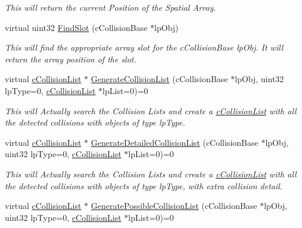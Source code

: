 \begin{DoxyCompactItemize}
\begin{DoxyCompactList}\small\item\em This will return the current Position of the Spatial Array. \end{DoxyCompactList}\item 
\hypertarget{classc_collision_handler_a10c1268f0a7418032431e3029baff400}{
virtual uint32 \hyperlink{classc_collision_handler_a10c1268f0a7418032431e3029baff400}{FindSlot} (cCollisionBase $\ast$lpObj)}
\label{classc_collision_handler_a10c1268f0a7418032431e3029baff400}

\begin{DoxyCompactList}\small\item\em This will find the appropriate array slot for the cCollisionBase lpObj. It will return the array position of the slot. \end{DoxyCompactList}\item 
\hypertarget{classc_collision_handler_ae624b12e08bdae8b2dd252bcfa6f7d36}{
virtual \hyperlink{classc_collision_list}{cCollisionList} $\ast$ \hyperlink{classc_collision_handler_ae624b12e08bdae8b2dd252bcfa6f7d36}{GenerateCollisionList} (cCollisionBase $\ast$lpObj, uint32 lpType=0, \hyperlink{classc_collision_list}{cCollisionList} $\ast$lpList=0)=0}
\label{classc_collision_handler_ae624b12e08bdae8b2dd252bcfa6f7d36}

\begin{DoxyCompactList}\small\item\em This will Actually search the Collision Lists and create a \hyperlink{classc_collision_list}{cCollisionList} with all the detected collisions with objects of type lpType. \end{DoxyCompactList}\item 
\hypertarget{classc_collision_handler_a865d6839d425b63571835d7091744269}{
virtual \hyperlink{classc_collision_list}{cCollisionList} $\ast$ \hyperlink{classc_collision_handler_a865d6839d425b63571835d7091744269}{GenerateDetailedCollisionList} (cCollisionBase $\ast$lpObj, uint32 lpType=0, \hyperlink{classc_collision_list}{cCollisionList} $\ast$lpList=0)=0}
\label{classc_collision_handler_a865d6839d425b63571835d7091744269}

\begin{DoxyCompactList}\small\item\em This will Actually search the Collision Lists and create a \hyperlink{classc_collision_list}{cCollisionList} with all the detected collisions with objects of type lpType, with extra collision detail. \end{DoxyCompactList}\item 
\hypertarget{classc_collision_handler_a5db1655fb21f6218649ab32a07699a3e}{
virtual \hyperlink{classc_collision_list}{cCollisionList} $\ast$ \hyperlink{classc_collision_handler_a5db1655fb21f6218649ab32a07699a3e}{GeneratePossibleCollisionList} (cCollisionBase $\ast$lpObj, uint32 lpType=0, \hyperlink{classc_collision_list}{cCollisionList} $\ast$lpList=0)=0}
\label{classc_collision_handler_a5db1655fb21f6218649ab32a07699a3e}


\end{DoxyCompactItemize}
